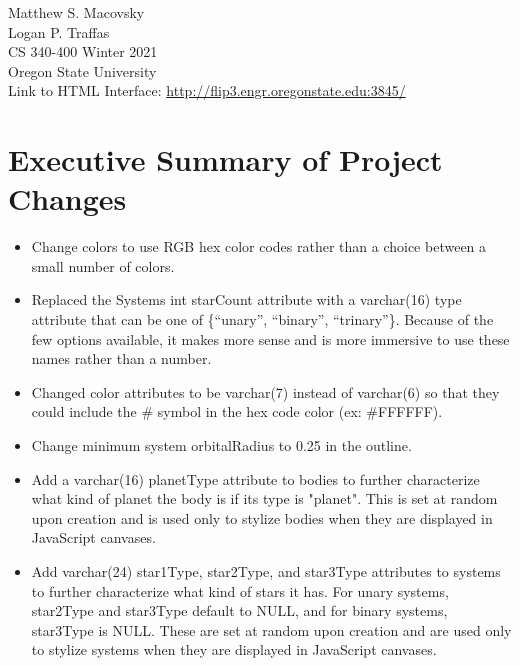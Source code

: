 \documentclass[12pt]{article}
\let\Oldsection\section
\renewcommand{\section}{\FloatBarrier\Oldsection}
\begin{document}
\begin{titlepage}
    \vspace*{15em}{\centering\Huge Stellaris Sandbox: \\ Portfolio Assignment\par}
    \vspace{1em}
    \centering \Large Matthew S. Macovsky \\
    \vspace{0.5em}
    \centering \Large Logan P. Traffas \\
    \vspace{1em}
    \centering \Large CS 340-400 Winter 2021 \\
    \vspace{1em}
    \centering \Large Oregon State University \\
    \vspace*{\fill}
    \large Link to HTML Interface: \url{http://flip3.engr.oregonstate.edu:3845/}
\end{titlepage}

\tableofcontents

\newpage
\section{Executive Summary of Project Changes}

\begin{itemize}
    \item Change colors to use RGB hex color codes rather than a choice between a small number of colors.
    \item Replaced the Systems int starCount attribute with a varchar(16) type attribute that can be one of \{“unary”, “binary”, “trinary”\}. Because of the few options available, it makes more sense and is more immersive to use these names rather than a number.
    \item Changed color attributes to be varchar(7) instead of varchar(6) so that they could include the \# symbol in the hex code color (ex: \#FFFFFF).
    \item Change minimum system orbitalRadius to 0.25 in the outline.
    \item Add a varchar(16) planetType attribute to bodies to further characterize what kind of planet the body is if its type is "planet". This is set at random upon creation and is used only to stylize bodies when they are displayed in JavaScript canvases.
    \item Add varchar(24) star1Type, star2Type, and star3Type attributes to systems to further characterize what kind of stars it has. For unary systems, star2Type and star3Type default to NULL, and for binary systems, star3Type is NULL. These are set at random upon creation and are used only to stylize systems when they are displayed in JavaScript canvases.
\end{itemize}
\end{document}
